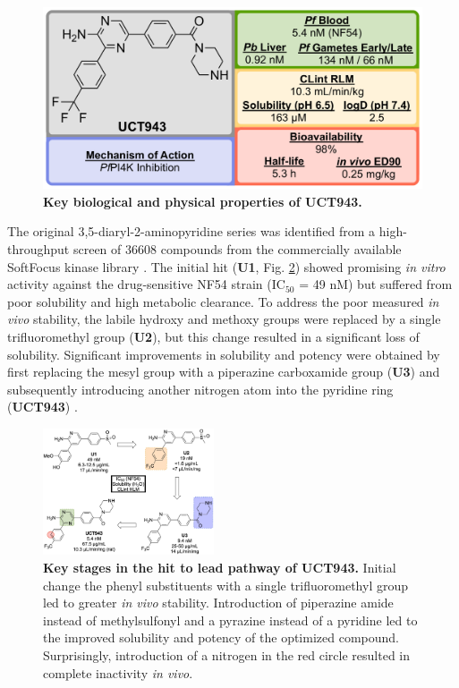 \documentclass[twocolumn]{bmcart}%
\begin{document}
\begin{figure}[h]
	\includegraphics [scale=0.575] {Figure10}
	\caption{\bf Key biological and physical properties of UCT943.}
	\label{Figure10}
\end{figure}

The original 3,5-diaryl-2-aminopyridine series was identified from a high-throughput screen of 36608 compounds from the commercially available SoftFocus kinase library \cite{Younis2012}. The initial hit (\textbf{U1}, Fig. \ref{Figure11}) showed promising \textit{in vitro} activity against the drug-sensitive NF54 strain (IC$_{50}$ = 49 nM) but suffered from poor solubility and high metabolic clearance. To address the poor measured \textit{in vivo} stability, the labile hydroxy and methoxy groups were replaced by a single trifluoromethyl group (\textbf{U2}), but this change resulted in a significant loss of solubility. Significant improvements in solubility and potency were obtained by first replacing the mesyl group with a piperazine carboxamide group (\textbf{U3}) and subsequently introducing another nitrogen atom into the pyridine ring (\textbf{UCT943}) \cite{Cabrera2012,Younis2013}.

\begin{figure}[h]
	\includegraphics [width=0.45\textwidth] {Figure11}
	\caption{{\bf Key stages in the hit to lead pathway of UCT943.} Initial change the phenyl substituents with a single trifluoromethyl group led to greater \textit{in vivo} stability. Introduction of piperazine amide instead of methylsulfonyl and a pyrazine instead of a pyridine led to the improved solubility and potency of the optimized compound. Surprisingly, introduction of a nitrogen in the red circle resulted in complete inactivity \textit{in vivo}.}
	\label{Figure11}
\end{figure}
\end{document}
